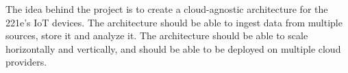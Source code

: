 The idea behind the project is to create a cloud-agnostic architecture for the 221e's IoT devices. The architecture should be able to ingest data from multiple sources, store it and  analyze it. The architecture should be able to scale horizontally and vertically, and should be able to be deployed on multiple cloud providers.



